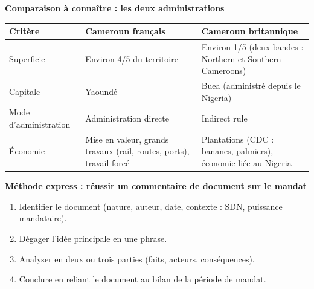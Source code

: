 \documentclass[11pt]{article}
\begin{document}
\begin{bilan}
\textbf{Comparaison à connaître : les deux administrations}
\begin{center}
\begin{tabularx}{\linewidth}{|X|X|X|}
\hline
\rowcolor{popblueL} \textbf{Critère} & \textbf{Cameroun français} & \textbf{Cameroun britannique} \\
\hline
Superficie & Environ 4/5 du territoire & Environ 1/5 (deux bandes : Northern et Southern Cameroons) \\
\hline
Capitale & Yaoundé & Buea (administré depuis le Nigeria) \\
\hline
Mode d'administration & Administration directe & Indirect rule \\
\hline
Économie & Mise en valeur, grands travaux (rail, routes, ports), travail forcé & Plantations (CDC : bananes, palmiers), économie liée au Nigeria \\
\hline
\end{tabularx}
\end{center}

\textbf{Méthode express : réussir un commentaire de document sur le mandat}
\begin{enumerate}
  \item Identifier le document (nature, auteur, date, contexte : SDN, puissance mandataire).
  \item Dégager l'idée principale en une phrase.
  \item Analyser en deux ou trois parties (faits, acteurs, conséquences).
  \item Conclure en reliant le document au bilan de la période de mandat.
\end{enumerate}
\end{bilan}
\end{document}
